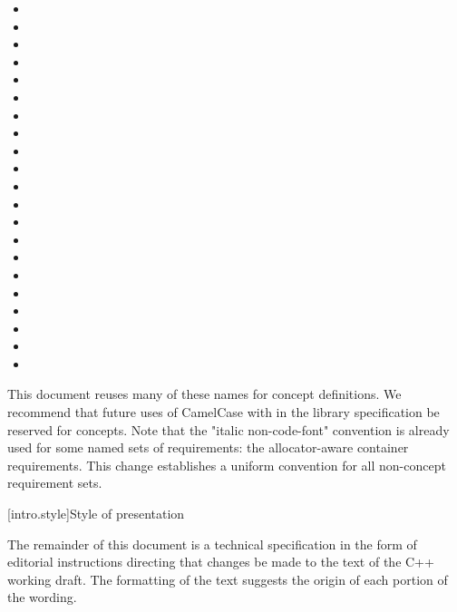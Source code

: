 \pnum
{}
\begin{itemize}
\item {}
\item {}
\item {}
\item {}
\item {}
\item {}
\item {}
\item {}
\item {}
\item {}
\item {}
\item {}
\item {}
\item {}
\item {}
\item {}
\item {}
\item {}
\item {}
\item {}
\item {}
\end{itemize}
This document reuses many of these names for concept definitions. We recommend
that future uses of CamelCase with  in the library specification
be reserved for concepts. Note that the "italic non-code-font" convention is
already used for some named sets of requirements: the allocator-aware container
requirements. This change establishes a uniform convention for all non-concept
requirement sets.


[intro.style]{Style of presentation}

\pnum
The remainder of this document is a technical specification in the form of
editorial instructions directing that changes be made to the text of the C++
working draft. The formatting of the text suggests the origin of each portion of
the wording.

